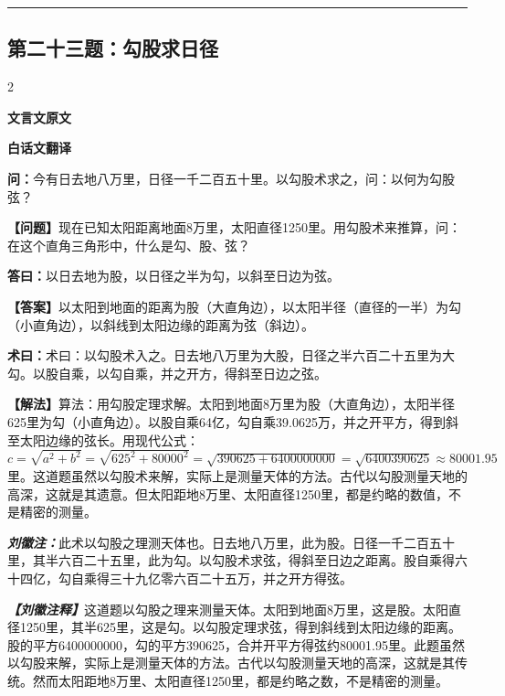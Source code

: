 \documentclass[10pt,a4paper]{article}
\newcommand{\wen}[1]{\textbf{\color{problemcolor}问：}#1\par}
\newcommand{\da}[1]{\textbf{答曰：}#1\par}
\newcommand{\shu}[1]{\textbf{术曰：}#1\par}
\newcommand{\liuhui}[1]{{\color{commentarycolor}\textit{\textbf{刘徽注：}}#1\par}}
\newcommand{\classicalheader}[1]{{\centering\large\bfseries\color{classicalcolor} #1\par\vspace{0.5em}}}
\newcommand{\wenmodern}[1]{\textbf{\color{moderncolor}【问题】}#1\par}
\newcommand{\damodern}[1]{\textbf{【答案】}#1\par}
\newcommand{\shumodern}[1]{\textbf{【解法】}#1\par}
\newcommand{\liuhuimodern}[1]{{\color{commentarycolor}\textit{\textbf{【刘徽注释】}}#1\par}}
\newcommand{\modernheader}[1]{{\centering\large\bfseries\color{moderncolor} #1\par\vspace{0.5em}}}
\newcommand{\problemsec}[1]{\subsection*{#1}}
\begin{document}
\vspace{0.3cm}
\hrule
\vspace{0.3cm}

\problemsec{第二十三题：勾股求日径}
\begin{paracol}{2}
\classicalheader{文言文原文}
\switchcolumn
\modernheader{白话文翻译}
\switchcolumn*

\wen{今有日去地八万里，日径一千二百五十里。以勾股术求之，问：以何为勾股弦？}

\switchcolumn

\wenmodern{现在已知太阳距离地面8万里，太阳直径1250里。用勾股术来推算，问：在这个直角三角形中，什么是勾、股、弦？}

\switchcolumn*

\da{以日去地为股，以日径之半为勾，以斜至日边为弦。}

\switchcolumn

\damodern{以太阳到地面的距离为股（大直角边），以太阳半径（直径的一半）为勾（小直角边），以斜线到太阳边缘的距离为弦（斜边）。}

\switchcolumn*

\shu{术曰：以勾股术入之。日去地八万里为大股，日径之半六百二十五里为大勾。以股自乘，以勾自乘，并之开方，得斜至日边之弦。}

\switchcolumn

\shumodern{算法：用勾股定理求解。太阳到地面8万里为股（大直角边），太阳半径625里为勾（小直角边）。以股自乘64亿，勾自乘39.0625万，并之开平方，得到斜至太阳边缘的弦长。用现代公式：$c=\sqrt{a^2+b^2}=\sqrt{625^2+80000^2}=\sqrt{390625+6400000000}=\sqrt{6400390625}\approx80001.95$里。这道题虽然以勾股术来解，实际上是测量天体的方法。古代以勾股测量天地的高深，这就是其遗意。但太阳距地8万里、太阳直径1250里，都是约略的数值，不是精密的测量。}

\switchcolumn*

\liuhui{此术以勾股之理测天体也。日去地八万里，此为股。日径一千二百五十里，其半六百二十五里，此为勾。以勾股术求弦，得斜至日边之距离。股自乘得六十四亿，勾自乘得三十九亿零六百二十五万，并之开方得弦。}

\switchcolumn

\liuhuimodern{这道题以勾股之理来测量天体。太阳到地面8万里，这是股。太阳直径1250里，其半625里，这是勾。以勾股定理求弦，得到斜线到太阳边缘的距离。股的平方6400000000，勾的平方390625，合并开平方得弦约80001.95里。此题虽然以勾股来解，实际上是测量天体的方法。古代以勾股测量天地的高深，这就是其传统。然而太阳距地8万里、太阳直径1250里，都是约略之数，不是精密的测量。}

\end{paracol}
\end{document}
